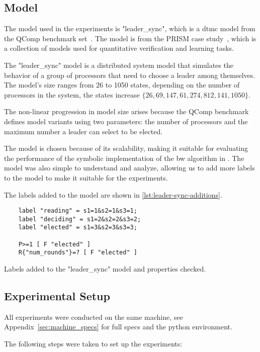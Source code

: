 \subsection{Model}
The model used in the experiments is "leader\_sync", which is a \gls{dtmc} model from the QComp benchmark set~\cite{hartmanns2019quantitative}.
The model is from the PRISM case study~\cite{kwiatkowska2012prism}, which is a collection of models used for quantitative verification and learning tasks.

The "leader\_sync" model is a distributed system model that simulates the behavior of a group of processors that need to choose a leader among themselves.
The model's size ranges from 26 to 1050 states, depending on the number of processors in the system, the states increase $\{26, 69, 147, 61, 274, 812, 141, 1050\}$.

The non-linear progression in model size arises because the QComp benchmark defines model variants using two parameters: the number of processors and the maximum number a leader can select to be elected.

The model is chosen because of its scalability, making it suitable for evaluating the performance of the symbolic implementation of the \gls{bw} algorithm in \JajapyTwo.
The model was also simple to understand and analyze, allowing us to add more labels to the model to make it suitable for the experiments.

The labels added to the model are shown in \autoref{lst:leader-sync-additions}.

\begin{listing}
    \begin{verbatim}
    label "reading" = s1=1&s2=1&s3=1;
    label "deciding" = s1=2&s2=2&s3=2;
    label "elected" = s1=3&s2=3&s3=3;

    P>=1 [ F "elected" ]
    R{"num_rounds"}=? [ F "elected" ]
    \end{verbatim}
    \caption{Labels added to the "leader\_sync" model and properties checked.}
    \label{lst:leader-sync-additions}
\end{listing}


\subsection{Experimental Setup}
All experiments were conducted on the same machine, see Appendix~\ref{sec:machine_specs} for full specs and the python environment.

The following steps were taken to set up the experiments:


